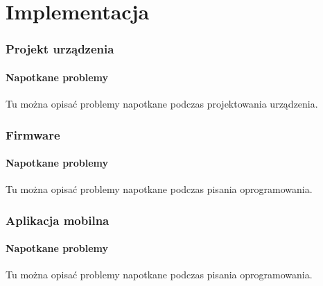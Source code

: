 \part{Implementacja}

\section{Projekt urządzenia}
\subsection{Napotkane problemy}
Tu można opisać problemy napotkane podczas projektowania urządzenia.

\section{Firmware}
\subsection{Napotkane problemy}
Tu można opisać problemy napotkane podczas pisania oprogramowania.

\section{Aplikacja mobilna}
\subsection{Napotkane problemy}
Tu można opisać problemy napotkane podczas pisania oprogramowania.